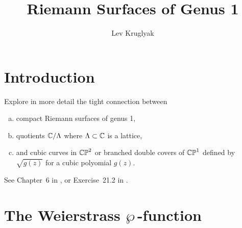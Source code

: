 \documentclass{lkx_paper}
\title{\textbf{Riemann Surfaces of Genus 1}}
\date{}
\author{Lev Kruglyak}
\begin{document}
\maketitle

\tableofcontents

\section{Introduction}
Explore in more detail the tight connection between
\begin{enumerate}[(a)]
	\item compact Riemann surfaces of genus 1,
	\item quotients $\mathbb{C}/\Lambda$ where $\Lambda\subset \mathbb{C}$ is a lattice,
	\item and cubic curves in $\mathbb{CP}^2$ or branched double covers of $\mathbb{CP}^1$ defined by $\sqrt{g(z)}$ for a cubic polyomial $g(z)$.
\end{enumerate}
See Chapter~6 in \cite{donaldson}, or Exercise~21.2 in \cite{forster}.

\section{The Weierstrass \texorpdfstring{$\wp\,$}{p}-function}

{}

\end{document}
